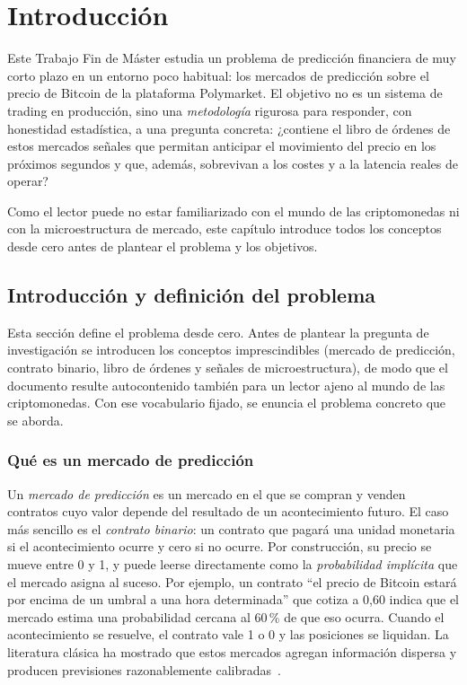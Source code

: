 %
\chapter{Introducción}
\label{ch::introduccion}

Este Trabajo Fin de Máster estudia un problema de predicción financiera de muy corto
plazo en un entorno poco habitual: los mercados de predicción sobre el precio de Bitcoin
de la plataforma Polymarket. El objetivo no es un sistema de trading en producción, sino
una \emph{metodología} rigurosa para responder, con honestidad estadística, a una
pregunta concreta: ¿contiene el libro de órdenes de estos mercados señales que permitan
anticipar el movimiento del precio en los próximos segundos y que, además, sobrevivan a
los costes y a la latencia reales de operar?

Como el lector puede no estar familiarizado con el mundo de las criptomonedas ni con la
microestructura de mercado, este capítulo introduce todos los conceptos desde cero antes
de plantear el problema y los objetivos.

\section{Introducción y definición del problema}

Esta sección define el problema desde cero. Antes de plantear la pregunta de
investigación se introducen los conceptos imprescindibles (mercado de predicción,
contrato binario, libro de órdenes y señales de microestructura), de modo que el documento
resulte autocontenido también para un lector ajeno al mundo de las criptomonedas. Con ese
vocabulario fijado, se enuncia el problema concreto que se aborda.

\subsection{Qué es un mercado de predicción}

Un \emph{mercado de predicción} es un mercado en el que se compran y venden contratos
cuyo valor depende del resultado de un acontecimiento futuro. El caso más sencillo es el
\emph{contrato binario}: un contrato que pagará una unidad monetaria si el acontecimiento
ocurre y cero si no ocurre. Por construcción, su precio se mueve entre 0 y 1, y puede
leerse directamente como la \emph{probabilidad implícita} que el mercado asigna al
suceso. Por ejemplo, un contrato ``el precio de Bitcoin estará por encima de un umbral a
una hora determinada'' que cotiza a 0,60 indica que el mercado estima una probabilidad
cercana al 60\,\% de que eso ocurra. Cuando el acontecimiento se resuelve, el contrato
vale 1 o 0 y las posiciones se liquidan. La literatura clásica ha mostrado que estos
mercados agregan información dispersa y producen previsiones razonablemente
calibradas~\cite{wolfers2004prediction}.

